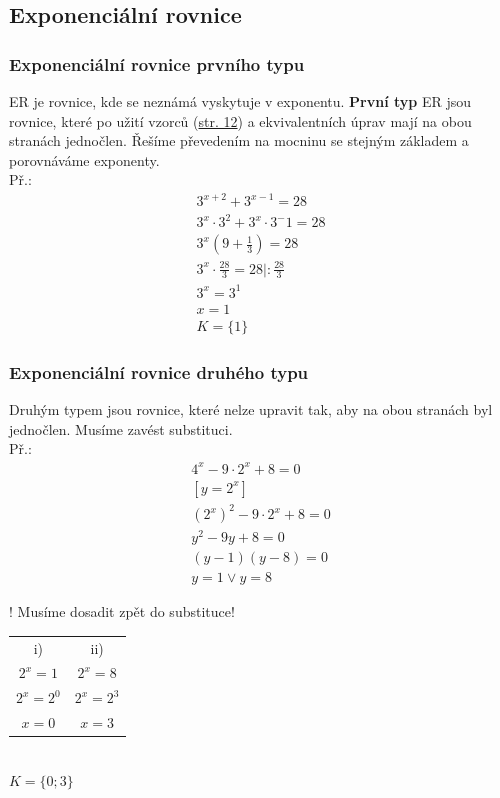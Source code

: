 \documentclass[12pt, a4paper]{article}
\begin{document}
\subsection*{Exponenciální rovnice}
\subsubsection*{Exponenciální rovnice prvního typu}
ER je rovnice, kde se neznámá vyskytuje v exponentu. \textbf{První typ} ER jsou rovnice, které po užití vzorců (\hyperlink{page.12}{str. 12}) a ekvivalentních úprav
mají na obou stranách jednočlen. Řešíme převedením na mocninu se stejným základem a porovnáváme exponenty.\\
Př.:\\
\[
\begin{aligned}
3^{x+2}+3^{x-1}=28\\
3^x \cdot 3^2 + 3^x \cdot 3^-1=28\\
3^x (9+\frac{1}{3})=28\\
3^x \cdot \frac{28}{3}=28 | : \frac{28}{3}\\
3^x = 3^1\\
x = 1\\
K = \{1\}
\end{aligned}
\]

\subsubsection*{Exponenciální rovnice druhého typu}
Druhým typem jsou rovnice, které nelze upravit tak, aby na obou stranách byl jednočlen. Musíme zavést substituci.\\
Př.:\\
\[
\begin{aligned}
4^x - 9 \cdot 2^x + 8=0\\
[y=2^x]\\
(2^x)^2 - 9 \cdot 2^x +8 =0\\
y^2-9y+8=0\\
(y-1)(y-8)=0\\
y = 1 \lor y = 8
\end{aligned}
\]
\begin{center}
! Musíme dosadit zpět do substituce!\\
\begin{tabular}{ c c }
i) & ii)\\
$2^x = 1$ & $2^x = 8$\\
$2^x = 2^0$ & $2^x = 2^3$\\
$x=0$ & $x=3$\\
\end{tabular}\\
$K=\{0;3\}$
\end{center}
\end{document}
